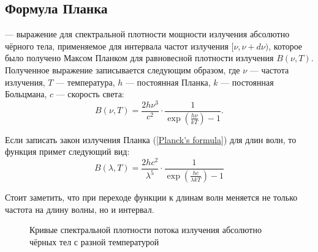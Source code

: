 \subsection{Формула Планка}

 --- выражение для спектральной плотности мощности излучения абсолютно чёрного тела, применяемое  для интервала частот излучения  $[\nu, \nu + d \nu)$, которое было получено Максом Планком для равновесной плотности излучения $B(\nu,T)$. Полученное выражение записывается следующим образом, где $\nu$ --- частота излучения, $T$ --- температура, $h$ --- постоянная Планка, $k$ --- постоянная Больцмана, $c$ --- скорость света:
\begin{equation}\label{Planck's formula}
B(\nu,T)=\frac{2h\nu^3}{c^2}\cdot \frac{1}{\exp\left(\frac{h\nu}{kT}\right)-1}.
\end{equation}

Если записать закон излучения Планка (\ref{Planck's formula}) для длин волн, то функция примет следующий вид:
\begin{equation}\label{Planck's formula2}
B(\lambda,T)=\frac{2hc^2}{\lambda^5} \cdot \frac{1}{\exp\left(\frac{hc}{\lambda kT}\right)-1}
\end{equation}

Стоит заметить, что при переходе функции к длинам волн меняется не только частота на длину волны, но и интервал. 

\begin{figure}[h!]
\begin{center}
\end{center}
\caption{Кривые спектральной плотности потока излучения абсолютно чёрных тел с разной температурой}\label{pic:wien-law}
\end{figure}

